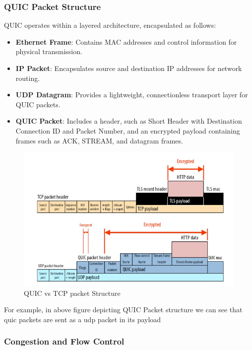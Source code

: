 \subsubsection{QUIC Packet Structure}

QUIC operates within a layered architecture, encapsulated as follows:

\begin{itemize}
    \item \textbf{Ethernet Frame}: Contains MAC addresses and control information for physical transmission.
    \item \textbf{IP Packet}: Encapsulates source and destination IP addresses for network routing.
    \item \textbf{UDP Datagram}: Provides a lightweight, connectionless transport layer for QUIC packets.
    \item \textbf{QUIC Packet}: Includes a header, such as Short Header with Destination Connection ID and Packet Number, and an encrypted payload containing frames such as ACK, STREAM, and datagram frames.
\end{itemize}

\begin{figure}[H]
\caption{QUIC vs TCP packet Structure}
\centering
\includegraphics[width=1\textwidth]{SOA/quicntcp.png}
\end{figure}


For example, in above figure \cite{marx2021-http3} depicting QUIC Packet structure we can see that quic packets are sent as a udp packet in its payload


\subsubsection{Congestion and Flow Control}

